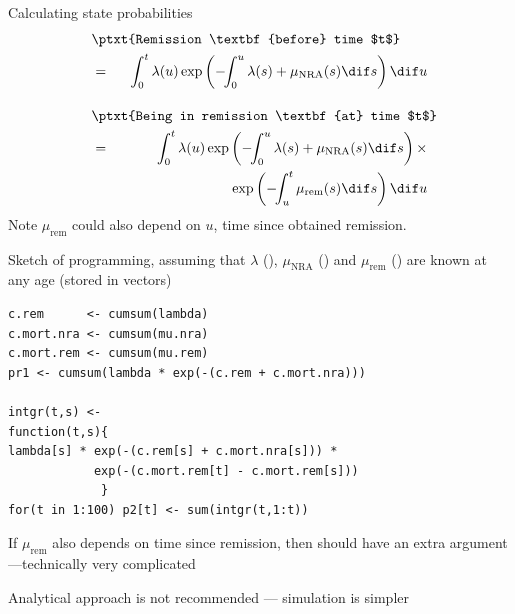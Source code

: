 \begin{frame}{Calculating state probabilities}
\ \\[-3em]
\begin{eqnarray*}
 \lefteqn{ \ptxt{Remission \textbf{before} time $t$} } \\ & = &
 \int_0^t \lambda(u) \exp\left( -\!\! \int_0^u \lambda(s) + \mu_\text{NRA}(s) \dif s
          \right) \dif u\\[1em]
 \lefteqn{ \ptxt{Being in remission \textbf{at} time $t$} } \\ & = &
 \int_0^t \lambda(u) \exp\left( -\!\! \int_0^u \lambda(s) +
                                               \mu_\text{NRA}(s) \dif s \right)
                     \times \\ & & \hspace*{8em}
                     \exp\left( -\!\! \int_u^t \mu_\text{rem}(s) \dif s \right)
          \dif u
\end{eqnarray*}
Note $\mu_\text{rem}$ could also depend on $u$, time since obtained remission.
\end{frame}

\begin{frame}[fragile]
  Sketch of programming, assuming that
$\lambda$ (),
$\mu_\text{NRA}$ () and
$\mu_\text{rem}$ () are known at any age (stored in vectors)
\renewcommand{\baselinestretch}{0.85}
\footnotesize
\begin{verbatim}
c.rem      <- cumsum(lambda)
c.mort.nra <- cumsum(mu.nra)
c.mort.rem <- cumsum(mu.rem)
pr1 <- cumsum(lambda * exp(-(c.rem + c.mort.nra)))

intgr(t,s) <-
function(t,s){
lambda[s] * exp(-(c.rem[s] + c.mort.nra[s])) *
            exp(-(c.mort.rem[t] - c.mort.rem[s]))
             }
for(t in 1:100) p2[t] <- sum(intgr(t,1:t))
\end{verbatim}
\normalsize
\renewcommand{\baselinestretch}{1.00}
If $\mu_\text{rem}$ also depends on time since remission, then
 should have an extra argument---technically very
complicated

Analytical approach is not recommended --- simulation is simpler
\end{frame}

